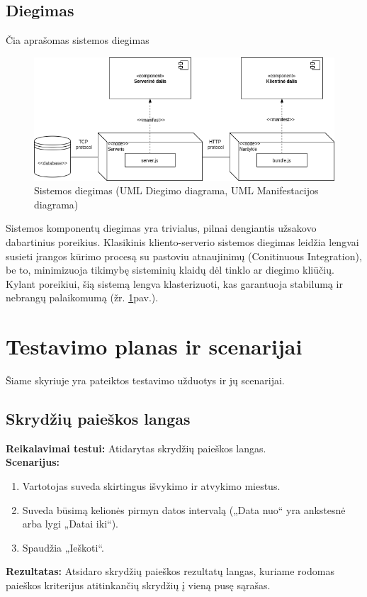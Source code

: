 \documentclass{VUMIFPSkursinis}
\begin{document}
      \subsection{Diegimas}
      Čia aprašomas sistemos diegimas
        \begin{figure}[H]
          \centering
          \includegraphics[scale=0.7]{img/Diegimas}
          \caption{Sistemos diegimas (UML Diegimo diagrama, UML Manifestacijos diagrama)}
          \label{deployment}
        \end{figure}
        Sistemos komponentų diegimas yra trivialus, pilnai dengiantis užsakovo dabartinius poreikius. Klasikinis kliento-serverio sistemos diegimas leidžia lengvai susieti įrangos kūrimo procesą su pastoviu atnaujinimų (Conitinuous Integration), be to, minimizuoja tikimybę sisteminių klaidų dėl tinklo ar diegimo kliūčių. Kylant poreikiui, šią sistemą lengva klasterizuoti, kas garantuoja stabilumą ir nebrangų palaikomumą (žr. \ref{deployment}pav.).
    \section{Testavimo planas ir scenarijai}
    Šiame skyriuje yra pateiktos testavimo užduotys ir jų scenarijai.
        \subsection{Skrydžių paieškos langas}
            \noindent\textbf{Reikalavimai testui:} Atidarytas skrydžių paieškos langas. \\

            \noindent\textbf{Scenarijus:}
                \begin{enumerate}
                    \item Vartotojas suveda skirtingus išvykimo ir atvykimo miestus.
                    \item Suveda būsimą kelionės pirmyn datos intervalą („Data nuo“ yra ankstesnė arba lygi „Datai iki“).
                    \item Spaudžia „Ieškoti“.
                \end{enumerate}
            \textbf{Rezultatas:} Atsidaro skrydžių paieškos rezultatų langas, kuriame rodomas paieškos kriterijus atitinkančių skrydžių į vieną pusę sąrašas.\\
\end{document}
